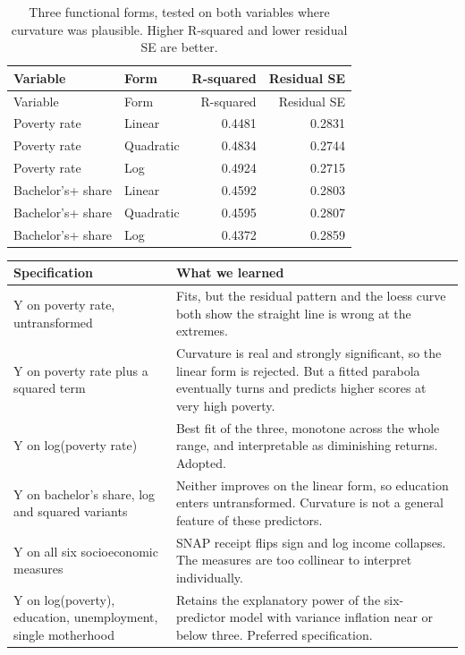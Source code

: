 \documentclass[
]{article}
\newcounter{none} %
\begin{document}
\begin{longtable}[]{@{}llrr@{}}
\caption{Three functional forms, tested on both variables where
curvature was plausible. Higher R-squared and lower residual SE are
better.}\tabularnewline
\toprule\noalign{}
Variable & Form & R-squared & Residual SE \\
\midrule\noalign{}
\endfirsthead
\toprule\noalign{}
Variable & Form & R-squared & Residual SE \\
\midrule\noalign{}
\endhead
\bottomrule\noalign{}
\endlastfoot
Poverty rate & Linear & 0.4481 & 0.2831 \\
Poverty rate & Quadratic & 0.4834 & 0.2744 \\
Poverty rate & Log & 0.4924 & 0.2715 \\
Bachelor's+ share & Linear & 0.4592 & 0.2803 \\
Bachelor's+ share & Quadratic & 0.4595 & 0.2807 \\
Bachelor's+ share & Log & 0.4372 & 0.2859 \\
\end{longtable}

{\def\LTcaptype{none} %
\begin{longtable}[]{@{}
  >{\raggedright\arraybackslash}p{}
  >{\raggedright\arraybackslash}p{}@{}}
\toprule\noalign{}
\begin{minipage}[b]{\linewidth}\raggedright
Specification
\end{minipage} & \begin{minipage}[b]{\linewidth}\raggedright
What we learned
\end{minipage} \\
\midrule\noalign{}
\endhead
\bottomrule\noalign{}
\endlastfoot
Y on poverty rate, untransformed & Fits, but the residual pattern and
the loess curve both show the straight line is wrong at the extremes. \\
Y on poverty rate plus a squared term & Curvature is real and strongly
significant, so the linear form is rejected. But a fitted parabola
eventually turns and predicts higher scores at very high poverty. \\
Y on log(poverty rate) & Best fit of the three, monotone across the
whole range, and interpretable as diminishing returns. Adopted. \\
Y on bachelor's share, log and squared variants & Neither improves on
the linear form, so education enters untransformed. Curvature is not a
general feature of these predictors. \\
Y on all six socioeconomic measures & SNAP receipt flips sign and log
income collapses. The measures are too collinear to interpret
individually. \\
Y on log(poverty), education, unemployment, single motherhood & Retains
the explanatory power of the six-predictor model with variance inflation
near or below three. Preferred specification. \\
\end{longtable}
}
\end{document}
